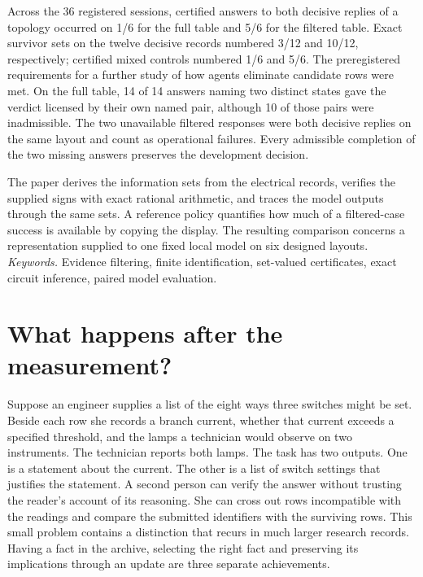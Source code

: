 \documentclass[12pt,letterpaper]{article}
\begin{document}
Across the 36 registered sessions, certified answers to both decisive replies of a topology occurred on 1/6 for the full table and 5/6 for the filtered table. Exact survivor sets on the twelve decisive records numbered 3/12 and 10/12, respectively; certified mixed controls numbered 1/6 and 5/6. The preregistered requirements for a further study of how agents eliminate candidate rows were met. On the full table, 14 of 14 answers naming two distinct states gave the verdict licensed by their own named pair, although 10 of those pairs were inadmissible. The two unavailable filtered responses were both decisive replies on the same layout and count as operational failures. Every admissible completion of the two missing answers preserves the development decision.

The paper derives the information sets from the electrical records, verifies the supplied signs with exact rational arithmetic, and traces the model outputs through the same sets. A reference policy quantifies how much of a filtered-case success is available by copying the display. The resulting comparison concerns a representation supplied to one fixed local model on six designed layouts.
\vfill\small\textit{Keywords.} Evidence filtering, finite identification, set-valued certificates, exact circuit inference, paired model evaluation.
\clearpage\tableofcontents\clearpage{}



\section{What happens after the measurement?}

Suppose an engineer supplies a list of the eight ways three switches might be set. Beside each row she records a branch current, whether that current exceeds a specified threshold, and the lamps a technician would observe on two instruments. The technician reports both lamps. The task has two outputs. One is a statement about the current. The other is a list of switch settings that justifies the statement. A second person can verify the answer without trusting the reader's account of its reasoning. She can cross out rows incompatible with the readings and compare the submitted identifiers with the surviving rows. This small problem contains a distinction that recurs in much larger research records. Having a fact in the archive, selecting the right fact and preserving its implications through an update are three separate achievements.
\end{document}
